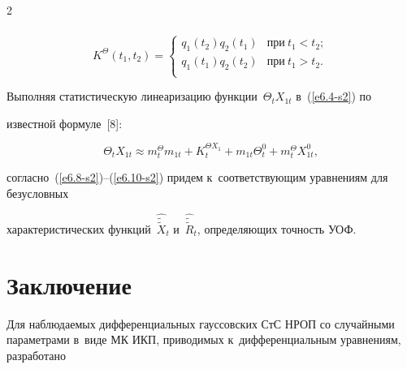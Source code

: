 \begin{multicols}{2}
\begin{multline*}
\end{multline*}



\vspace*{-4pt}



\noindent

    $$

    K^\Theta (t_1, t_2) =\begin{cases}

    q_1(t_2) q_2 (t_1) &  \mbox{при}\  t_1<t_2;\\

    q_1(t_1) q_2 (t_2) &  \mbox{при}\  t_1>t_2.\\

\end{cases}

   $$





Выполняя статистическую линеаризацию функции~$\Theta_t X_{1t}$ в~(\ref{e6.4-s2}) по 

известной формуле~[8]:

\begin{equation*}

\Theta_t X_{1t} \approx m_t^\Theta m_{1t} + K_t^{\Theta X_1} 

+m_{1t}\Theta_t^0 + m_t^\Theta X_{1t}^0,


\end{equation*}

согласно~(\ref{e6.8-s2})--(\ref{e6.10-s2}) придем к~соответствующим уравнениям для безусловных 

характеристических функций~$\hat{\tilde{\tilde X}}_t$ и~$\hat{\tilde{\tilde R}}_t$, определяющих точ\-ность УОФ.



\vspace*{-4pt}





\section{Заключение}



\vspace*{-2pt}



Для наблюдаемых дифференциальных гауссовских СтС НРОП со случайными параметрами в~виде МК ИКП, приводимых к~дифференциальным уравнениям, разработано 


\end{multicols}
